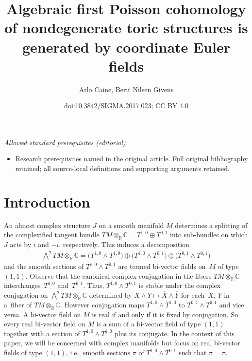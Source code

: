 \documentclass[10pt,a4paper]{amsart}
\title{Algebraic first Poisson cohomology of nondegenerate toric structures is generated by coordinate Euler fields}
\author{Arlo Caine, Berit Nilsen Givens}
\date{doi:10.3842/SIGMA.2017.023; CC BY 4.0}
\numberwithin{equation}{section}
\begin{document}
\maketitle
\noindent\textit{Allowed standard prerequisites (editorial).}\begin{itemize}
\item Research prerequisites named in the original article. Full original bibliography retained; all source-local definitions and supporting arguments retained.
\end{itemize}\medskip
\section{Introduction}

An almost complex structure $J$ on a smooth manifold $M$ determines a splitting of the complexif\/ied tangent bundle $TM\otimes_{\mathbb R} {\mathbb C}=T^{1,0}\oplus T^{0,1}$ into sub-bundles on which $J$ acts by $i$ and $-i$, respectively. This induces a decomposition
\begin{gather*}
\textstyle{\bigwedge^2} TM\otimes_{\mathbb R}{\mathbb C}=\big(T^{1,0}\wedge T^{1,0}\big)\oplus \big(T^{1,0} \wedge T^{0,1}\big)\oplus \big(T^{0,1}\wedge T^{0,1}\big)
\end{gather*}
and the smooth sections of $T^{1,0} \wedge T^{0,1}$ are termed bi-vector f\/ields on~$M$ of type~$(1,1)$. Observe that the canonical complex conjugation in the f\/ibers $TM\otimes_{\mathbb R} {\mathbb C}$ interchanges~$T^{1,0}$ and~$T^{0,1}$. Thus, $T^{1,0} \wedge T^{0,1}$ is stable under the complex conjugation on $\bigwedge^2 TM\otimes_{\mathbb R}{\mathbb C}$ determined by $X\wedge Y\mapsto \overline{X}\wedge \overline{Y}$ for each~$X$, $Y$ in a~f\/iber of $TM\otimes_{\mathbb R} {\mathbb C}$. However conjugation maps $T^{1,0}\wedge T^{1,0}$ to $T^{0,1}\wedge T^{0,1}$ and vice versa. A bi-vector f\/ield on $M$ is real if and only if it is f\/ixed by conjugation. So every real bi-vector f\/ield on $M$ is a sum of a bi-vector f\/ield of type $(1,1)$ together with a section of $T^{1,0}\wedge T^{1,0}$ plus its conjugate. In the context of this paper, we will be concerned with complex manifolds but focus on real bi-vector f\/ields of type $(1,1)$, i.e., smooth sections $\pi$ of $T^{1,0} \wedge T^{0,1}$ such that $\overline{\pi}=\pi$.
\end{document}
